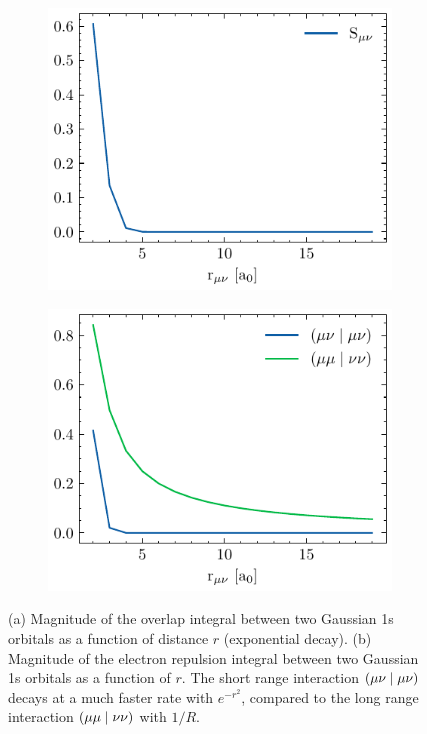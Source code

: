 \begin{figure}
\centering
\begin{subfigure}{0.45\linewidth}
\includegraphics[scale=0.8]{overlap_decay}
\caption{}
\end{subfigure}
\begin{subfigure}{0.45\linewidth}
\includegraphics[scale=0.8]{eri_decay}
\caption{}
\end{subfigure}%
\caption{(a) Magnitude of the overlap integral between two Gaussian 1s orbitals as a function of distance $r$ (exponential decay). (b) Magnitude of the electron repulsion integral between two Gaussian 1s orbitals as a function of $r$. The short range interaction $\left( \mu\nu \mid \mu\nu \right)$ decays at a  much faster rate with $e^{-r^2}$, compared to the long range interaction $\left( \mu\mu \mid \nu\nu \right)$ with $1/R$.}
\label{fig:HCHAIN_DECAY}
\end{figure}

